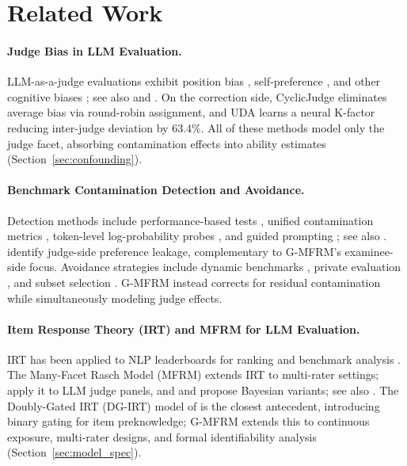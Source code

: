 \section{Related Work}
\label{sec:related_work}

\paragraph{Judge Bias in LLM Evaluation.}
LLM-as-a-judge evaluations exhibit position bias \citep{wang2024positionbias}, self-preference \citep{panickssery2024selffavor}, and other cognitive biases \citep{koo2024cobbler, ye2025justice, bavaresco2025judgebench}; see also \citet{li2024splitmerge} and \citet{fiedler2026bias_uncertainty}. On the correction side, CyclicJudge \citep{cyclicjudge2026} eliminates average bias via round-robin assignment, and UDA \citep{uda2026} learns a neural K-factor reducing inter-judge deviation by 63.4\%. All of these methods model only the judge facet, absorbing contamination effects into ability estimates (Section~\ref{sec:confounding}).

\paragraph{Benchmark Contamination Detection and Avoidance.}
Detection methods include performance-based tests \citep{constat2024}, unified contamination metrics \citep{dcr2025}, token-level log-probability probes \citep{logprober2024, mink2024}, and guided prompting \citep{golchin2024timetravel, oren2024proving}; see also \citet{deng2024contamination, sainz2023contamination}. \citet{preference_leakage2026} identify judge-side preference leakage, complementary to G-MFRM's examinee-side focus. Avoidance strategies include dynamic benchmarks \citep{livebench2025}, private evaluation \citep{truce2024}, and subset selection \citep{polo2024tinybenchmarks}. G-MFRM instead corrects for residual contamination while simultaneously modeling judge effects.

\paragraph{Item Response Theory (IRT) and MFRM for LLM Evaluation.}
IRT has been applied to NLP leaderboards for ranking and benchmark analysis \citep{lalor2019irt, rodriguez2021irt, vania2021irt}. The Many-Facet Rasch Model (MFRM) \citep{linacre1989mfrm, linacre1994mfrm} extends IRT to multi-rater settings; \citet{jiao2025mfrm_llm} apply it to LLM judge panels, and \citet{uto2020generalized} and \citet{choi2026irt_judge} propose Bayesian variants; see also \citet{zhou2025psnirt}. The Doubly-Gated IRT (DG-IRT) model of \citet{shu2013dgirt} is the closest antecedent, introducing binary gating for item preknowledge; G-MFRM extends this to continuous exposure, multi-rater designs, and formal identifiability analysis (Section~\ref{sec:model_spec}).
